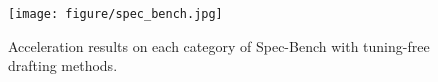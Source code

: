 \begin{figure}[t!]
\centering
\texttt{[image: figure/spec\_bench.jpg]}
\vspace{-.8em}
\caption{\small Acceleration results on each category of Spec-Bench with tuning-free drafting methods.}
\label{fig:spec_bench}
\end{figure}